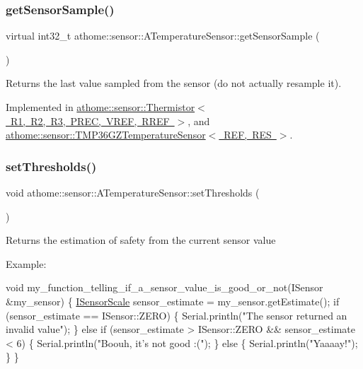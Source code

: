 \subsubsection{\texorpdfstring{get\+Sensor\+Sample()}{getSensorSample()}}
{\footnotesize\ttfamily virtual int32\+\_\+t athome\+::sensor\+::\+A\+Temperature\+Sensor\+::get\+Sensor\+Sample (\begin{DoxyParamCaption}{ }\end{DoxyParamCaption})\hspace{0.3cm}{\ttfamily [pure virtual]}}

Returns the last value sampled from the sensor (do not actually resample it). 

Implemented in \mbox{\hyperlink{classathome_1_1sensor_1_1_thermistor_abc45d8d277fb186b5d303f9e53bf73d4}{athome\+::sensor\+::\+Thermistor$<$ R1, R2, R3, P\+R\+E\+C, V\+R\+E\+F, R\+R\+E\+F $>$}}, and \mbox{\hyperlink{classathome_1_1sensor_1_1_t_m_p36_g_z_temperature_sensor_ae0e101ee54c5c64842d2cab9fb9292f4}{athome\+::sensor\+::\+T\+M\+P36\+G\+Z\+Temperature\+Sensor$<$ R\+E\+F, R\+E\+S $>$}}.

\mbox{\label{classathome_1_1sensor_1_1_a_temperature_sensor_a1c323184ac116784e877151895dfd080}} 
\subsubsection{\texorpdfstring{set\+Thresholds()}{setThresholds()}}
{\footnotesize\ttfamily void athome\+::sensor\+::\+A\+Temperature\+Sensor\+::set\+Thresholds (\begin{DoxyParamCaption}\item[{const \mbox{\hyperlink{structathome_1_1sensor_1_1_i_sensor_1_1_i_sensor_thresholds}{I\+Sensor\+Thresholds}} \&}]{ }\end{DoxyParamCaption})\hspace{0.3cm}{\ttfamily [virtual]}}

Returns the estimation of safety from the current sensor value

Example\+:


\begin{DoxyCode}
\textcolor{keywordtype}{void} my\_function\_telling\_if\_a\_sensor\_value\_is\_good\_or\_not(ISensor &my\_sensor) \{
  \mbox{\hyperlink{classathome_1_1sensor_1_1_i_sensor_aa70bc27a4c17c86caf96cca776541ddf}{ISensorScale}} sensor\_estimate = my\_sensor.getEstimate();
  \textcolor{keywordflow}{if} (sensor\_estimate == ISensor::ZERO) \{
    Serial.println(\textcolor{stringliteral}{"The sensor returned an invalid value"});
  \}
  \textcolor{keywordflow}{else} \textcolor{keywordflow}{if} (sensor\_estimate > ISensor::ZERO && sensor\_estimate < 6) \{
    Serial.println(\textcolor{stringliteral}{"Boouh, it's not good :("});
  \}
  \textcolor{keywordflow}{else} \{
    Serial.println(\textcolor{stringliteral}{"Yaaaay!"});
  \}
\}
\end{DoxyCode}
 

